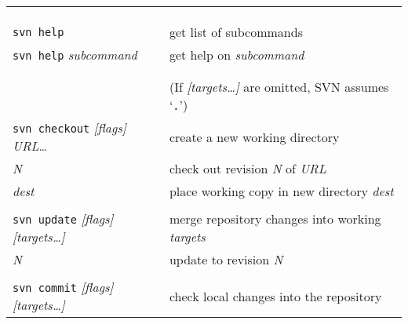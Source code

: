 \documentclass{report}
\begin{document}
\hspace{-0.7in}
\begin{tabular}{ll}
\vspace{0.1in} \hspace{-0.1in}{\bf\LARGE SVN Quick Reference}
						& \\ \\

\vspace{0.1in} \hspace{-0.1in}{\bf\Large Getting Help}
                                                &  \\

{\tt svn help}	                      		&
get list of subcommands                          \\

{\tt svn help} {\sl subcommand}  		&
get help on {\sl subcommand}		          \\


\\
\\
\vspace{0.1in} \hspace{-0.1in}{\bf\Large Working Copies}   &
(If {\sl [targets\dots]} are omitted, SVN assumes `{\tt .}')  \\

{\tt svn checkout} {\sl [flags]} {\sl URL}\dots &
create a new working directory			 \\

\hspace{0.5in}{\tt -r} {\sl N}		&
check out revision {\sl N} of {\sl URL}	  \\
\hspace{0.5in}{\tt -d} {\sl dest}		&
place working copy in new directory {\sl dest}	 \\

\\
{\tt svn update} {\sl [flags]} {\sl [targets\dots]}	&
merge repository changes into working {\sl targets}	  \\

\hspace{0.5in}{\tt -r} {\sl N}		&
update to revision {\sl N}		  \\

\\
{\tt svn commit} {\sl [flags]} {\sl [targets\dots]}	&
check local changes into the repository		  \\


\end{tabular}
\end{document}
